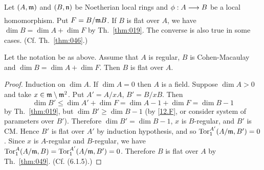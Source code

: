\documentclass[../main]{subfiles}
\begin{document}
\newparagraph
Let $(A,\mathfrak{m})$ and $(B,\mathfrak{n})$ be Noetherian local rings and $\phi:A\varrightarrow{}B$ be a local homomorphism. Put $F = B/\mathfrak{m}B$. If $B$ is flat over $A$, we have \newline $\dim B = \dim A + \dim F$ by Th.~\ref{thm:019}. The converse is also true in some cases. (Cf. Th.~\ref{thm:046}.)

\begin{theorem}
\label{thm:081}
    Let the notation be as above. Assume that $A$ is regular, $B$ is Cohen-Macaulay and $\dim B = \dim A + \dim F$. Then $B$ is flat over $A$.
\end{theorem}
\begin{proof}
    Induction on $\dim A$. If $\dim A = 0$ then $A$ is a field. Suppose $\dim A>0$ and take $x\in \mathfrak{m}\setminus \mathfrak{m}^2$. Put $A' = A/xA$, $B'=B/xB$. Then \[\dim B' \le \dim A' + \dim F = \dim A - 1 + \dim F = \dim B - 1\] by Th.~\ref{thm:019}, but $\dim B'\ge \dim B - 1$ (by \ref{12.F}, or consider system of parameters over $B'$). Therefore $\dim B' = \dim B - 1$, $x$ is $B$-regular, and $B'$ is CM. Hence $B'$ is flat over $A'$ by induction hypothesis, and so $\operatorname{Tor}^{A'}_1(A/\mathfrak{m}, B')=0$. Since $x$ is $A$-regular and $B$-regular, we have $\operatorname{Tor}^A_1(A/\mathfrak{m}, B) = \operatorname{Tor}^{A'}_1(A/\mathfrak{m}, B') = 0$. Therefore $B$ is flat over $A$ by Th.~\ref{thm:049}. (Cf. \cite{egaIV2} (6.1.5).)
\end{proof}
\end{document}

